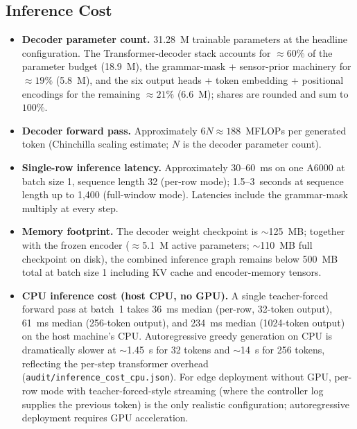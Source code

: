 \subsection{Inference Cost}
\label{app:repl-inference}

\begin{itemize}
\item \textbf{Decoder parameter count.} 31.28~M trainable parameters at
the headline configuration. The Transformer-decoder stack accounts for
$\approx\!60\%$ of the parameter budget (18.9~M), the grammar-mask +
sensor-prior machinery for $\approx\!19\%$ (5.8~M), and the six output
heads + token embedding + positional encodings for the remaining
$\approx\!21\%$ (6.6~M); shares are rounded and sum to $100\%$.
\item \textbf{Decoder forward pass.} Approximately $6N \approx 188$~MFLOPs
per generated token (Chinchilla scaling estimate; $N$ is the decoder
parameter count).
\item \textbf{Single-row inference latency.} Approximately 30--60~ms on
one A6000 at batch size 1, sequence length 32 (per-row mode);
1.5--3~seconds at sequence length up to 1{,}400 (full-window mode).
Latencies include the grammar-mask multiply at every step.
\item \textbf{Memory footprint.} The decoder weight checkpoint is
$\sim$125~MB; together with the frozen encoder ($\approx$5.1~M active
parameters; $\sim$110~MB full checkpoint on disk), the combined
inference graph remains below 500~MB total at batch size 1 including KV cache and
encoder-memory tensors.
\item \textbf{CPU inference cost (host CPU, no GPU).} A single
teacher-forced forward pass at batch~1 takes 36~ms median (per-row,
32-token output), 61~ms median (256-token output), and 234~ms median
(1024-token output) on the host machine's CPU. Autoregressive greedy
generation on CPU is dramatically slower at $\sim$1.45~s for 32 tokens
and $\sim$14~s for 256 tokens, reflecting the per-step transformer
overhead (\texttt{audit/\allowbreak inference\_cost\_cpu.json}). For edge deployment
without GPU, per-row mode with teacher-forced-style streaming (where
the controller log supplies the previous token) is the only realistic
configuration; autoregressive deployment requires GPU acceleration.
\end{itemize}

